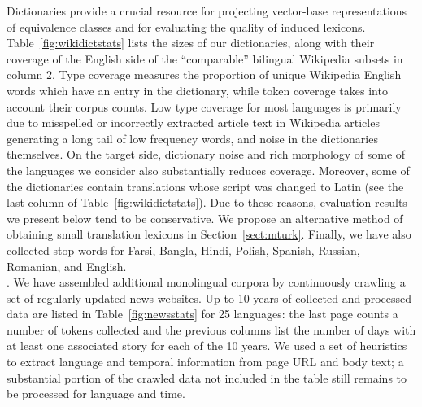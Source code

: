 \documentclass{article}
\newcommand{\secref}[1]{Section~\ref{#1}}
\newcommand{\tabref}[1]{Table~\ref{#1}}
\begin{document}
  Dictionaries provide a crucial resource for projecting vector-base representations of equivalence classes and for evaluating the quality of induced lexicons.  \tabref{fig:wikidictstats} lists the sizes of our dictionaries, along with their coverage of the English side of the ``comparable'' bilingual Wikipedia subsets in column 2.  Type coverage measures the proportion of unique Wikipedia English words which have an entry in the dictionary, while token coverage takes into account their corpus counts. Low type coverage for most languages is primarily due to misspelled or incorrectly extracted article text in Wikipedia articles generating a long tail of low frequency words, and noise in the dictionaries themselves.  On the target side, dictionary noise and rich morphology of some of the languages we consider also substantially reduces coverage.  Moreover, some of the dictionaries contain translations whose script was changed to Latin (see the last column of \tabref{fig:wikidictstats}).  Due to these reasons, evaluation results we present below tend to be conservative.  We propose an alternative method of obtaining small translation lexicons in \secref{sect:mturk}.  Finally, we have also collected stop words for Farsi, Bangla, Hindi, Polish, Spanish, Russian, Romanian, and English.\\

.  We have assembled additional monolingual corpora by continuously crawling a set of regularly updated news websites.  Up to 10 years of collected and processed data are listed in \tabref{fig:newsstats} for 25 languages: the last page counts a number of tokens collected and the previous columns list the number of days with at least one associated story for each of the 10 years.  We used a set of heuristics to extract language and temporal information from page URL and body text; a substantial portion of the crawled data not included in the table still remains to be processed for language and time.
\end{document}
